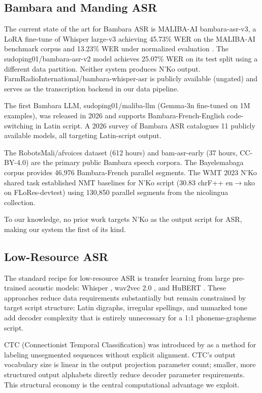 \documentclass[11pt]{article}
\begin{document}
\subsection{Bambara and Manding ASR}

The current state of the art for Bambara ASR is MALIBA-AI bambara-asr-v3, a LoRA fine-tune of Whisper large-v3 achieving 45.73\% WER on the MALIBA-AI benchmark corpus and 13.23\% WER under normalized evaluation \cite{maliba2024bambara}.
The sudoping01/bambara-asr-v2 model achieves 25.07\% WER on its test split using a different data partition.
Neither system produces N'Ko output.
FarmRadioInternational/bambara-whisper-asr is publicly available (ungated) and serves as the transcription backend in our data pipeline.

The first Bambara LLM, sudoping01/maliba-llm (Gemma-3n fine-tuned on 1M examples), was released in 2026 and supports Bambara-French-English code-switching in Latin script.
A 2026 survey of Bambara ASR \cite{bambara_survey_2026} catalogues 11 publicly available models, all targeting Latin-script output.

The RobotsMali/afvoices dataset (612 hours) and bam-asr-early (37 hours, CC-BY-4.0) \cite{robotsmali2024bamasrearly} are the primary public Bambara speech corpora.
The Bayelemabaga corpus \cite{bayelemabaga2025} provides 46,976 Bambara-French parallel segments.
The WMT 2023 N'Ko shared task \cite{wmt2023nko} established NMT baselines for N'Ko script (30.83 chrF++ en$\to$nko on FLoRes-devtest) using 130,850 parallel segments from the nicolingua collection.

To our knowledge, no prior work targets N'Ko as the output script for ASR, making our system the first of its kind.

\subsection{Low-Resource ASR}

The standard recipe for low-resource ASR is transfer learning from large pre-trained acoustic models: Whisper \cite{radford2023robust}, wav2vec 2.0 \cite{baevski2020wav2vec}, and HuBERT \cite{hsu2021hubert}.
These approaches reduce data requirements substantially but remain constrained by target script structure: Latin digraphs, irregular spellings, and unmarked tone add decoder complexity that is entirely unnecessary for a 1:1 phoneme-grapheme script.

CTC (Connectionist Temporal Classification) was introduced by \citet{graves2006connectionist} as a method for labeling unsegmented sequences without explicit alignment.
CTC's output vocabulary size is linear in the output projection parameter count; smaller, more structured output alphabets directly reduce decoder parameter requirements.
This structural economy is the central computational advantage we exploit.
\end{document}
